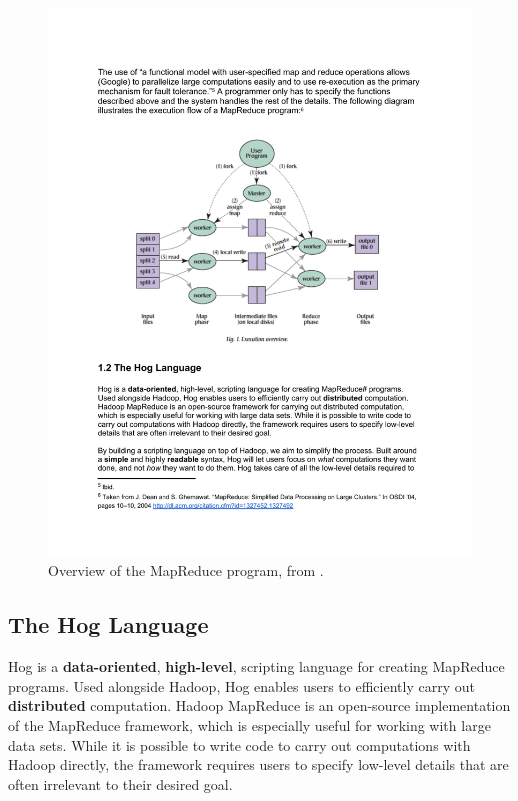 \documentclass{book}
\begin{document}
\begin{center}
\begin{figure}
  \label{fig:map_reduce_overview}
  \includegraphics[width=1.0\textwidth]{img/map_reduce_overview.pdf}
  \caption{Overview of the MapReduce program, from \cite{ghemawat:2003}.}
\end{figure}
\end{center}

\subsection{The Hog Language}
\label{sub:hog_language}

Hog is a \textbf{data-oriented}, \textbf{high-level}, scripting language for
creating MapReduce programs. Used alongside Hadoop, Hog enables users to
efficiently carry out \textbf{distributed} computation. Hadoop MapReduce is an
open-source implementation of the MapReduce framework, which is especially useful
for working with large data sets. While it is possible to write code to carry out
computations with Hadoop directly, the framework requires users to specify
low-level details that are often irrelevant to their desired goal.
\end{document}
